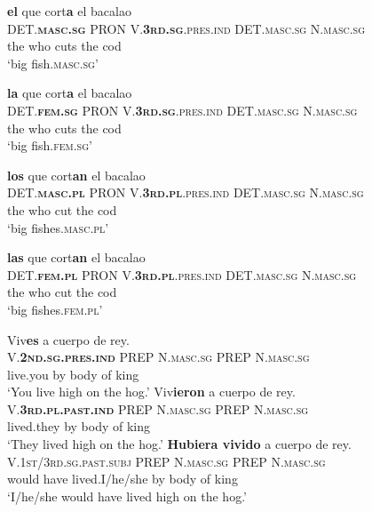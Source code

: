 \documentclass[output=paper]{langsci/langscibook}
\begin{document}
\begin{exe}
\ex
	\begin{xlist}
	\ex \label{ex:bacalaoA}
    \glll \textbf{el} que cort\textbf{a} el bacalao\\
    \textsc{DET.\textbf{masc.sg}} \textsc{PRON} \textsc{V.\textbf{3rd.sg}.pres.ind} \textsc{DET.masc.sg} \textsc{N.masc.sg}\\
    the who cuts the cod \\
    \glt `big fish.\textsc{masc.sg}'
    
    \ex \label{ex:bacalaoB}
    \glll \textbf{la} que cort\textbf{a} el bacalao\\
    \textsc{DET.\textbf{fem.sg}} \textsc{PRON} \textsc{V.\textbf{3rd.sg}.pres.ind} \textsc{DET.masc.sg} \textsc{N.masc.sg}\\
    the who cuts the cod \\
    \glt `big fish.\textsc{fem.sg}'
    
    \ex \label{ex:bacalaoC}
    \glll \textbf{los} que cort\textbf{an} el bacalao\\
   \textsc{DET.\textbf{masc.pl}} \textsc{PRON} \textsc{V.\textbf{3rd.pl}.pres.ind} 
   \textsc{DET.masc.sg} \textsc{N.masc.sg}\\
    the who cut the cod \\
    \glt `big fishes.\textsc{masc.pl}'
    
    \ex \label{ex:bacalaoD}
    \glll \textbf{las} que cort\textbf{an} el bacalao\\
    \textsc{DET.\textbf{fem.pl}} \textsc{PRON} \textsc{V.\textbf{3rd.pl}.pres.ind }
    \textsc{DET.masc.sg} \textsc{N.masc.sg}\\
    the who cut the cod \\
    \glt `big fishes.\textsc{fem.pl}'
	\end{xlist}
	

\ex
	\begin{xlist}
	\ex \label{ex:reyA}
    \glll Viv\textbf{es} a cuerpo de rey.\\
    \textsc{V.\textbf{2nd.sg.pres.ind}} \textsc{PREP} \textsc{N.masc.sg} \textsc{PREP} \textsc{N.masc.sg} \\
    {live.you} by body of king\\
    \glt `You live high on the hog.'
    \ex \label{ex:reyB}
    \glll Viv\textbf{ieron} a cuerpo de rey.\\
   \textsc{V.\textbf{3rd.pl.past.ind}}  \textsc{PREP} \textsc{N.masc.sg} \textsc{PREP} \textsc{N.masc.sg} \\
    {lived.they} by body of king\\
    \glt `They lived high on the hog.'
    \ex \label{ex:reyC}
    \glll \textbf{Hubiera vivido} a cuerpo de rey.\\
    \textsc{V.1st/3rd.sg.past.subj} \textsc{PREP} \textsc{N.masc.sg} \textsc{PREP} \textsc{N.masc.sg} \\
    {would have lived.I/he/she} by body of king\\
    \glt `I/he/she would have lived high on the hog.'
	\end{xlist}
\end{exe}
\end{document}
